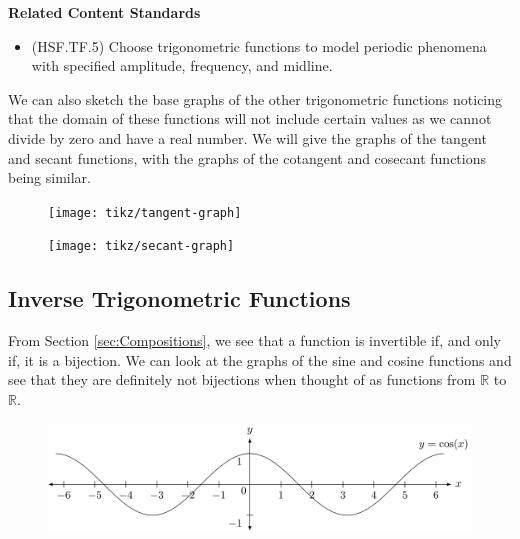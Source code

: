 \documentclass[
]{book}
\providecommand{\tightlist}{%
  \setlength{\itemsep}{0pt}\setlength{\parskip}{0pt}}
\newenvironment{standards}{}{}
\theoremstyle{definition}
\theoremstyle{definition}
\theoremstyle{definition}
\theoremstyle{definition}
\theoremstyle{remark}
\begin{document}
\begin{standards}

\begin{center}
\textbf{Related Content Standards}

\end{center}

\begin{itemize}
\tightlist
\item
  (HSF.TF.5) Choose trigonometric functions to model periodic phenomena with specified amplitude, frequency, and midline.
\end{itemize}

\end{standards}

We can also sketch the base graphs of the other trigonometric functions noticing that the domain of these functions will not include certain values as we cannot divide by zero and have a real number. We will give the graphs of the tangent and secant functions, with the graphs of the cotangent and cosecant functions being similar.

\begin{figure}

{\centering \texttt{[image: tikz/tangent-graph]} 

}

\end{figure}

\begin{figure}

{\centering \texttt{[image: tikz/secant-graph]} 

}

\end{figure}

\hypertarget{inverse-trigonometric-functions}{%
\subsection{Inverse Trigonometric Functions}\label{inverse-trigonometric-functions}}

From Section \ref{sec:Compositions}, we see that a function is invertible if, and only if, it is a bijection. We can look at the graphs of the sine and cosine functions and see that they are definitely not bijections when thought of as functions from \(\mathbb{R}\) to \(\mathbb{R}\).

\begin{figure}

{\centering \includegraphics[width=1\linewidth]{tikz/cosine-graph} 

}

\end{figure}
\end{document}
